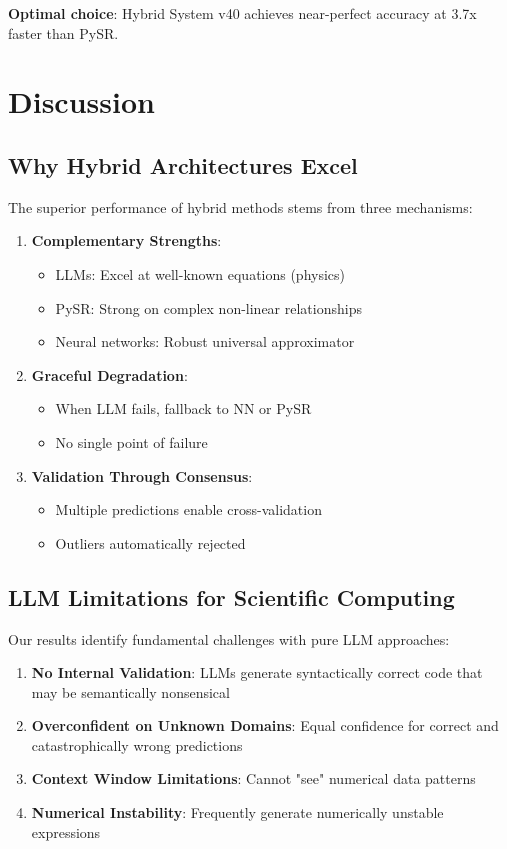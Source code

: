 \documentclass[11pt,a4paper]{article}
\begin{document}
\textbf{Optimal choice}: Hybrid System v40 achieves near-perfect accuracy at 3.7x faster than PySR.

\section{Discussion}

\subsection{Why Hybrid Architectures Excel}

The superior performance of hybrid methods stems from three mechanisms:

\begin{enumerate}
    \item \textbf{Complementary Strengths}:
    \begin{itemize}
        \item LLMs: Excel at well-known equations (physics)
        \item PySR: Strong on complex non-linear relationships
        \item Neural networks: Robust universal approximator
    \end{itemize}

    \item \textbf{Graceful Degradation}:
    \begin{itemize}
        \item When LLM fails, fallback to NN or PySR
        \item No single point of failure
    \end{itemize}

    \item \textbf{Validation Through Consensus}:
    \begin{itemize}
        \item Multiple predictions enable cross-validation
        \item Outliers automatically rejected
    \end{itemize}
\end{enumerate}

\subsection{LLM Limitations for Scientific Computing}

Our results identify fundamental challenges with pure LLM approaches:

\begin{enumerate}
    \item \textbf{No Internal Validation}: LLMs generate syntactically correct code that may be semantically nonsensical
    \item \textbf{Overconfident on Unknown Domains}: Equal confidence for correct and catastrophically wrong predictions
    \item \textbf{Context Window Limitations}: Cannot "see" numerical data patterns
    \item \textbf{Numerical Instability}: Frequently generate numerically unstable expressions
\end{enumerate}
\end{document}
